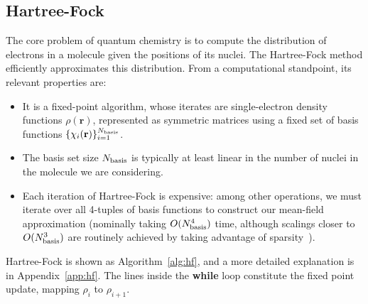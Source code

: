 \documentclass[twoside,11pt]{article}
\begin{document}
\subsection{Hartree-Fock}
The core problem of quantum chemistry is to compute the distribution of electrons in a molecule given the positions of its nuclei.  The Hartree-Fock method efficiently approximates this distribution.  From a computational standpoint, its relevant properties are:
\begin{itemize}
\item It is a fixed-point algorithm, whose iterates are single-electron density functions $\rho(\mathbf r)$, represented as symmetric matrices using a fixed set of basis functions $\{\chi_i(\mathbf r)\}_{i=1}^{N_{\rm basis}}$.
\item The basis set size $N_{\rm basis}$ is typically at least linear in the number of nuclei in the molecule we are considering.
\item Each iteration of Hartree-Fock is expensive: among other operations, we must iterate over all 4-tuples of basis functions to construct our mean-field approximation (nominally taking $O(N_{\rm basis}^4)$ time, although scalings closer to $O(N_{\rm basis}^3)$ are routinely achieved by taking advantage of sparsity~\citep{cook}).
\end{itemize}
Hartree-Fock is shown as Algorithm~\ref{alg:hf}, and a more detailed explanation is in Appendix~\ref{app:hf}.  The lines inside the \textbf{while} loop constitute the fixed point update, mapping $\rho_i$ to $\rho_{i+1}$.
\end{document}
